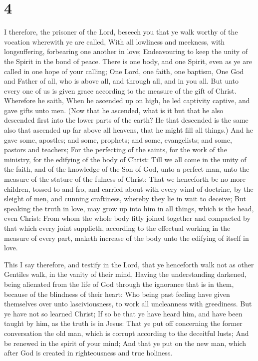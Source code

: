 \hypertarget{section-3}{%
\section{4}\label{section-3}}

 I therefore, the prisoner of the Lord, beseech you that ye
walk worthy of the vocation wherewith ye are called,  With
all lowliness and meekness, with longsuffering, forbearing one another
in love;  Endeavouring to keep the unity of the Spirit in
the bond of peace.  There is one body, and one Spirit, even
as ye are called in one hope of your calling;  One Lord, one
faith, one baptism,  One God and Father of all, who is above
all, and through all, and in you all.  But unto every one of
us is given grace according to the measure of the gift of Christ.
 Wherefore he saith, When he ascended up on high, he led
captivity captive, and gave gifts unto men.  (Now that he
ascended, what is it but that he also descended first into the lower
parts of the earth?  He that descended is the same also
that ascended up far above all heavens, that he might fill all things.)
 And he gave some, apostles; and some, prophets; and some,
evangelists; and some, pastors and teachers;  For the
perfecting of the saints, for the work of the ministry, for the edifying
of the body of Christ:  Till we all come in the unity of
the faith, and of the knowledge of the Son of God, unto a perfect man,
unto the measure of the stature of the fulness of Christ: 
That we henceforth be no more children, tossed to and fro, and carried
about with every wind of doctrine, by the sleight of men, and cunning
craftiness, whereby they lie in wait to deceive;  But
speaking the truth in love, may grow up into him in all things, which is
the head, even Christ:  From whom the whole body fitly
joined together and compacted by that which every joint supplieth,
according to the effectual working in the measure of every part, maketh
increase of the body unto the edifying of itself in love.

 This I say therefore, and testify in the Lord, that ye
henceforth walk not as other Gentiles walk, in the vanity of their mind,
 Having the understanding darkened, being alienated from
the life of God through the ignorance that is in them, because of the
blindness of their heart:  Who being past feeling have
given themselves over unto lasciviousness, to work all uncleanness with
greediness.  But ye have not so learned Christ;
 If so be that ye have heard him, and have been taught by
him, as the truth is in Jesus:  That ye put off concerning
the former conversation the old man, which is corrupt according to the
deceitful lusts;  And be renewed in the spirit of your
mind;  And that ye put on the new man, which after God is
created in righteousness and true holiness.


